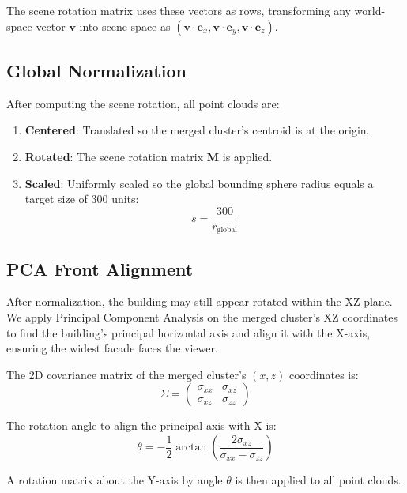 \documentclass[11pt, letterpaper]{article}
\begin{document}
The scene rotation matrix uses these vectors as rows, transforming any world-space vector $\mathbf{v}$ into scene-space as $(\mathbf{v} \cdot \mathbf{e}_x, \mathbf{v} \cdot \mathbf{e}_y, \mathbf{v} \cdot \mathbf{e}_z)$.

\subsection{Global Normalization}

After computing the scene rotation, all point clouds are:
\begin{enumerate}
    \item \textbf{Centered}: Translated so the merged cluster's centroid is at the origin.
    \item \textbf{Rotated}: The scene rotation matrix $\mathbf{M}$ is applied.
    \item \textbf{Scaled}: Uniformly scaled so the global bounding sphere radius equals a target size of 300 units:
    \begin{equation}
        s = \frac{300}{r_{\text{global}}}
    \end{equation}
\end{enumerate}

\subsection{PCA Front Alignment}
\label{sec:pca}

After normalization, the building may still appear rotated within the XZ plane. We apply Principal Component Analysis on the merged cluster's XZ coordinates to find the building's principal horizontal axis and align it with the X-axis, ensuring the widest facade faces the viewer.

The 2D covariance matrix of the merged cluster's $(x, z)$ coordinates is:
\begin{equation}
    \Sigma = \begin{pmatrix} \sigma_{xx} & \sigma_{xz} \\ \sigma_{xz} & \sigma_{zz} \end{pmatrix}
\end{equation}

The rotation angle to align the principal axis with X is:
\begin{equation}
    \theta = -\frac{1}{2}\arctan\left(\frac{2\sigma_{xz}}{\sigma_{xx} - \sigma_{zz}}\right)
\end{equation}

A rotation matrix about the Y-axis by angle $\theta$ is then applied to all point clouds.
\end{document}
